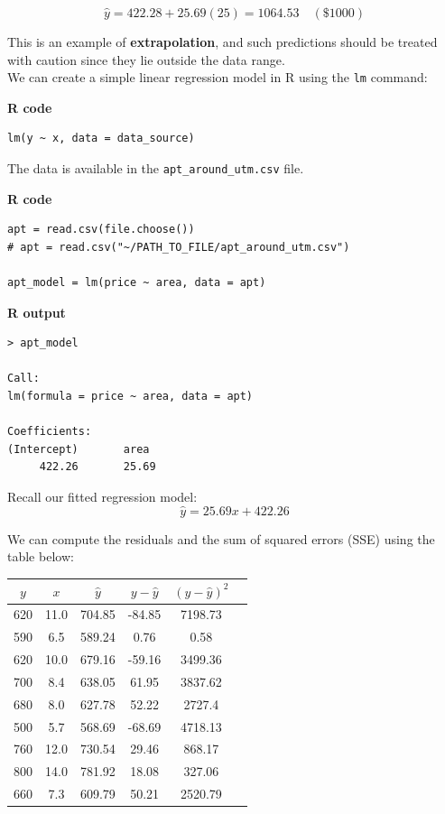 \begin{example}
\[
\hat{y} = 422.28 + 25.69(25) = 1064.53 \quad (\$1000)
\]

This is an example of \textbf{extrapolation}, and such predictions should be treated with caution since they lie outside the data range.\\
We can create a simple linear regression model in R using the \texttt{lm} command:

\noindent\textbf{R code}
\begin{tcolorbox}[colback=gray!10, colframe=black!45, arc=2mm]
\begin{verbatim}
lm(y ~ x, data = data_source)
\end{verbatim}
\end{tcolorbox}

\noindent The data is available in the \texttt{apt\_around\_utm.csv} file.

\noindent\textbf{R code}
\begin{tcolorbox}[colback=gray!10, colframe=black!45, arc=2mm]
\begin{verbatim}
apt = read.csv(file.choose())
# apt = read.csv("~/PATH_TO_FILE/apt_around_utm.csv")

apt_model = lm(price ~ area, data = apt)
\end{verbatim}
\end{tcolorbox}

\noindent\textbf{R output}
\begin{tcolorbox}[colback=gray!10, colframe=black!45, arc=2mm]
\begin{verbatim}
> apt_model

Call:
lm(formula = price ~ area, data = apt)

Coefficients:
(Intercept)       area  
     422.26       25.69  
\end{verbatim}
\end{tcolorbox}

Recall our fitted regression model:
\[
\hat{y} = 25.69x + 422.26
\]

We can compute the residuals and the sum of squared errors (SSE) using the table below:

\begin{center}
\renewcommand{\arraystretch}{1.2}
\begin{tabular}{cccccc}
\toprule
$y$ & $x$ & $\hat{y}$ & $y - \hat{y}$ & $(y - \hat{y})^2$ \\
\midrule
620 & 11.0 & 704.85 & -84.85 & 7198.73 \\
590 & 6.5 & 589.24 & 0.76 & 0.58 \\
620 & 10.0 & 679.16 & -59.16 & 3499.36 \\
700 & 8.4 & 638.05 & 61.95 & 3837.62 \\
680 & 8.0 & 627.78 & 52.22 & 2727.4 \\
500 & 5.7 & 568.69 & -68.69 & 4718.13 \\
760 & 12.0 & 730.54 & 29.46 & 868.17 \\
800 & 14.0 & 781.92 & 18.08 & 327.06 \\
660 & 7.3 & 609.79 & 50.21 & 2520.79 \\
\bottomrule
\end{tabular}
\end{center}


\end{example}
